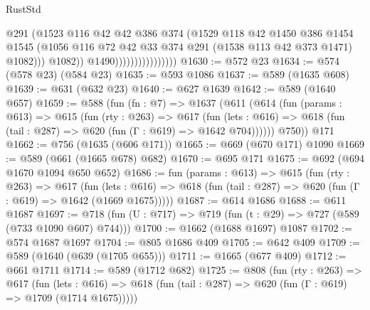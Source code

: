 \begin{lexlean}{RustStd}
\begin{coremodule}
{\begin{coremodule}
{{{{{{{{{                                        @291
                                        (@1523
                                          @116
                                          @42
                                          @42
                                          @386
                                          @374
                                          (@1529
                                            @118
                                            @42
                                            @1450
                                            @386
                                            @1454
                                            @1545
                                            (@1056
                                              @116
                                              @72
                                              @42
                                              @33
                                              @374
                                              @291
                                              (@1538 @113 @42 @373 @1471)
                                              @1082)))
                                        @1082))
                                    @1490))))))))))))))))
@1630 := @572 @23
@1634 := @574 (@578 @23) (@584 @23)
@1635 := @593 @1086
@1637 := @589 (@1635 @608)
@1639 := @631 (@632 @23)
@1640 := @627 @1639
@1642 := @589 (@1640 @657)
@1659 := @588
    (fun (fn : @7) =>
    @1637
      (@611
        (@614
          (fun (params : @613) =>
          @615
            (fun (rty : @263) =>
            @617
              (fun (lets : @616) =>
              @618 (fun (tail : @287) => @620 (fun (Γ : @619) => @1642 @704))))))
        @750))
    @171
@1662 := @756 (@1635 (@606 @171))
@1665 := @669 (@670 @171) @1090
@1669 := @589 (@661 (@1665 @678) @682)
@1670 := @695 @171
@1675 := @692 (@694 @1670 @1094 @650 @652)
@1686 := fun (params : @613) =>
  @615
    (fun (rty : @263) =>
    @617
      (fun (lets : @616) =>
      @618 (fun (tail : @287) => @620 (fun (Γ : @619) => @1642 (@1669 @1675)))))
@1687 := @614 @1686
@1688 := @611 @1687
@1697 := @718 (fun (U : @717) => @719 (fun (t : @29) => @727 (@589 (@733 @1090 @607) @744)))
@1700 := @1662 (@1688 @1697) @1087
@1702 := @574 @1687 @1697
@1704 := @805 @1686 @409
@1705 := @642 @409
@1709 := @589 (@1640 (@639 (@1705 @655)))
@1711 := @1665 (@677 @409)
@1712 := @661 @1711
@1714 := @589 (@1712 @682)
@1725 := @808
    (fun (rty : @263) =>
    @617
      (fun (lets : @616) =>
      @618 (fun (tail : @287) => @620 (fun (Γ : @619) => @1709 (@1714 @1675)))))
}}}}}}}}}
\end{coremodule}}
\end{coremodule}
\end{lexlean}
